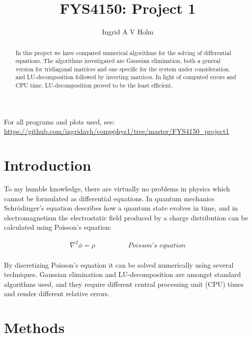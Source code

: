 \documentclass[11pt]{article}
\begin{document}
\title{FYS4150: Project 1}
\author{Ingrid A V Holm}
\maketitle

\begin{abstract}
In this project we have compared numerical algorithms for the solving of differential equations. The algorithms investigated are Gaussian elimination, both a general version for tridiagonal matrices and one specific for the system under consideration, and LU-decomposition followed by inverting matrices. In light of computed errors and CPU time, LU-decomposition proved to be the least efficient.
\end{abstract}

\begin{center}
For all programs and plots used, see: \url{https://github.com/ingridavh/compphys1/tree/master/FYS4150_project1}
\end{center}


\section*{Introduction}

\begin{flushleft}

To my humble knowledge, there are virtually no problems in physics which cannot be formulated as differential equations. In quantum mechanics Schrödinger's equation describes how a quantum state evolves in time, and in electromagnetism the electrostatic field produced by a charge distribution can be calculated using Poisson's equation:

\begin{equation}
\begin{matrix}
\nabla^2 \phi = \rho & &&&&&\textit{Poisson's equation}\\
\end{matrix}
\end{equation} 

By discretizing Poisson's equation it can be solved numerically using several techniques. Gaussian elimination and LU-decomposition are amongst standard algorithms used, and they require different central processing unit (CPU) times and render different relative errors.
\end{flushleft}

\pagebreak

\section*{Methods}
\end{document}
